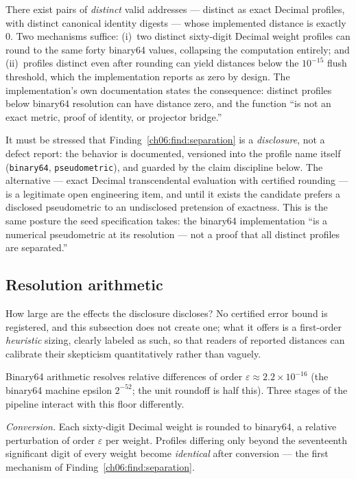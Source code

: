 \begin{finding}
\label{ch06:find:separation}
There exist pairs of \emph{distinct} valid addresses --- distinct as
exact Decimal profiles, with distinct canonical identity digests ---
whose implemented distance is exactly $0$. Two mechanisms suffice:
(i)~two distinct sixty-digit Decimal weight profiles can round to the
same forty binary64 values, collapsing the computation entirely; and
(ii)~profiles distinct even after rounding can yield distances below
the $10^{-15}$ flush threshold, which the implementation reports as
zero by design. The implementation's own documentation states the
consequence: distinct profiles below binary64 resolution can have
distance zero, and the function ``is not an exact metric, proof of
identity, or projector bridge.''
\end{finding}

It must be stressed that Finding~\ref{ch06:find:separation} is a
\emph{disclosure}, not a defect report: the behavior is documented,
versioned into the profile name itself (\texttt{binary64}, \texttt{pseudometric}),
and guarded by the claim discipline below. The alternative --- exact
Decimal transcendental evaluation with certified rounding --- is a
legitimate open engineering item, and until it exists the candidate
prefers a disclosed pseudometric to an undisclosed pretension of
exactness. This is the same posture the seed specification takes:
the binary64 implementation ``is a numerical pseudometric at its
resolution --- not a proof that all distinct profiles are separated.''

\subsection{Resolution arithmetic}\label{ch06:sec:resolution}

How large are the effects the disclosure discloses? No certified error
bound is registered, and this subsection does not create one; what it
offers is a first-order \emph{heuristic} sizing, clearly labeled as
such, so that readers of reported distances can calibrate their
skepticism quantitatively rather than vaguely.

Binary64 arithmetic resolves relative differences of order
$\varepsilon \approx 2.2 \times 10^{-16}$ (the binary64 machine
epsilon $2^{-52}$; the unit roundoff is half this). Three
stages of the pipeline interact with this floor differently.

\emph{Conversion.} Each sixty-digit Decimal weight is rounded to
binary64, a relative perturbation of order $\varepsilon$ per weight.
Profiles differing only beyond the seventeenth significant digit of
every weight become \emph{identical} after conversion --- the first
mechanism of Finding~\ref{ch06:find:separation}.

